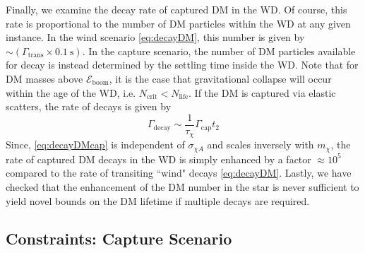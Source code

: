 \documentclass[preprintnumbers,amsmath,amssymb,prd,superscriptaddress]{revtex4}
\newcommand{\Eboom}{\mathcal{E}_\text{boom}}
\begin{document}
Finally, we examine the decay rate of captured DM in the WD. 
Of course, this rate is proportional to the number of DM particles within the WD at any given instance.  
In the wind scenario \eqref{eq:decayDM}, this number is given by $\sim (\Gamma_\text{trans} \times 0.1 ~\text{s})$.  
In the capture scenario, the number of DM particles available for decay is instead determined by the settling time inside the WD. 
Note that for DM masses above $\Eboom$, it is the case that gravitational collapse will occur within the age of the WD, i.e. $N_\text{crit} < N_\text{life}$. 
If the DM is captured via elastic scatters, the rate of decays is given by
\begin{equation}
\Gamma_\text{decay} \sim  \frac{1}{\tau_\chi} \Gamma_\text{cap} t_2
\label{eq:decayDMcap}
\end{equation}
Since, \eqref{eq:decayDMcap} is independent of $\sigma_{\chi A}$ and scales inversely with $m_\chi$, the rate of captured DM decays in the WD is simply enhanced by a factor $\approx 10^5$ compared to the rate of transiting ``wind" decays \eqref{eq:decayDM}.  
Lastly, we have checked that the enhancement of the DM number in the star is never sufficient to yield novel bounds on the DM lifetime if multiple decays are required.

\subsection{Constraints: Capture Scenario}
\end{document}
